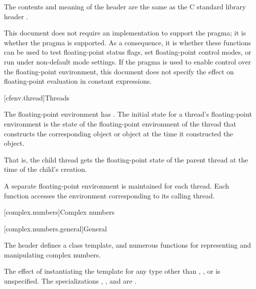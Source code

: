 \pnum
The contents and meaning of the header 
are the same as the C standard library header .
\begin{note}
This document does not require an implementation to support the
 pragma;
it is 
whether the pragma is supported. As a consequence,
it is 
whether these functions can be used to test floating-point status flags,
set floating-point control modes, or run under non-default mode settings.
If the pragma is used to enable control over the floating-point environment,
this document does not specify the effect on
floating-point evaluation in constant expressions.
\end{note}


[cfenv.thread]{Threads}

\pnum
The floating-point environment has .
The initial state for a thread's floating-point
environment is the state of the floating-point environment of the thread that constructs
the corresponding  object
or  object
at the time it
constructed the object.
\begin{note}
That is, the child thread gets the floating-point
state of the parent thread at the time of the child's creation.
\end{note}

\pnum
A separate floating-point environment is maintained for each thread. Each function
accesses the environment corresponding to its calling thread.

[complex.numbers]{Complex numbers}

[complex.numbers.general]{General}

\pnum
The header  defines a class template,
and numerous functions for representing and manipulating complex numbers.

\pnum
The effect of instantiating the template
for any type other than , , or  is unspecified.
The specializations
,
, and
 are .

